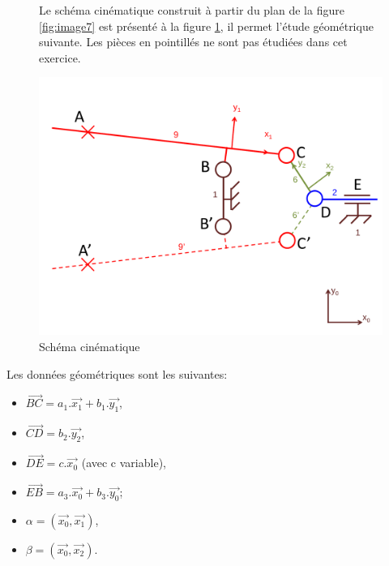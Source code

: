 \begin{figure}[htbp]
\begin{minipage}[c]{.4\linewidth}
Le schéma cinématique construit à partir du plan de la figure \ref{fig:image7} est présenté à la figure \ref{fig:image8}, il permet l'étude géométrique suivante. Les pièces en pointillés ne sont pas étudiées dans cet exercice.
\end{minipage}
\hfill
\begin{minipage}[c]{.55\linewidth}
\begin{center}
\includegraphics[width=1\linewidth]{img/ps_cin.pdf}
\caption{Schéma cinématique}
\label{fig:image8}
\end{center}
\end{minipage}
\end{figure}


Les données géométriques sont les suivantes:
\begin{itemize}
 \item $\overrightarrow{BC}=a_1.\overrightarrow{x_1}+b_1.\overrightarrow{y_1}$,
 \item $\overrightarrow{CD}=b_2.\overrightarrow{y_2}$,
 \item $\overrightarrow{DE}=c.\overrightarrow{x_0}$ (avec c variable),
 \item $\overrightarrow{EB}=a_3.\overrightarrow{x_0}+b_3.\overrightarrow{y_0}$;
 \item $\alpha=(\overrightarrow{x_0},\overrightarrow{x_1})$,
 \item $\beta=(\overrightarrow{x_0},\overrightarrow{x_2})$.
\end{itemize}

